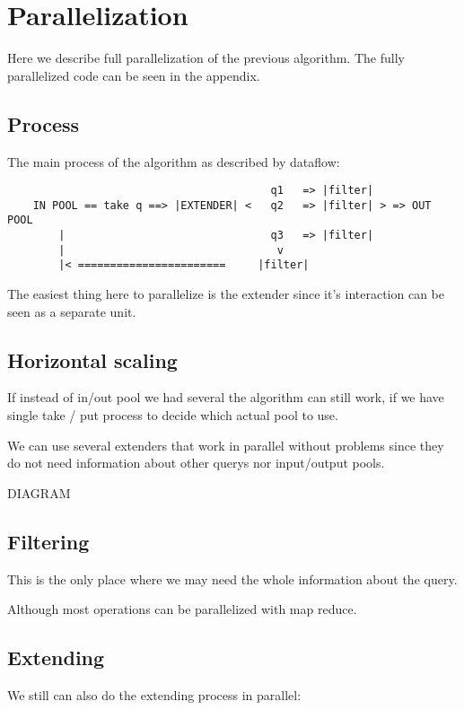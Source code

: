 \chapter{Parallelization}

Here we describe full parallelization of the previous 
algorithm. The fully parallelized code can be seen in the appendix.

\section{Process}

The main process of the algorithm as described by dataflow:

\begin{verbatim}
									     q1   => |filter|
	IN POOL == take q ==> |EXTENDER| <   q2   => |filter| > => OUT POOL
		|								 q3   => |filter|
		|							      v
		|< =======================     |filter|
\end{verbatim}

The easiest thing here to parallelize is the extender since it's interaction
can be seen as a separate unit.

\section{Horizontal scaling}

If instead of in/out pool we had several the algorithm can still work, if we
have single take / put process to decide which actual pool to use.

We can use several extenders that work in parallel without problems since they do not need information about other querys nor input/output pools.

DIAGRAM

\section{Filtering}

This is the only place where we may need the whole information about the query.

Although most operations can be parallelized with map reduce.

\section{Extending}

We still can also do the extending process in parallel:

